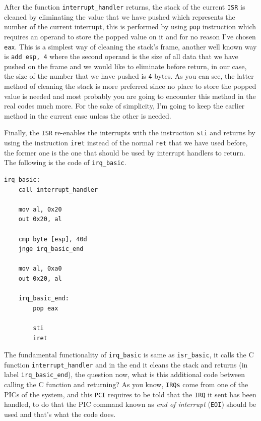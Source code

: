 After the function \lstinline!interrupt_handler! returns, the stack of
the current \lstinline!ISR! is cleaned by eliminating the value that we
have pushed which represents the number of the current interrupt, this
is performed by using \lstinline!pop! instruction which requires an
operand to store the popped value on it and for no reason I've chosen
\lstinline!eax!. This is a simplest way of cleaning the stack's frame,
another well known way is \lstinline!add esp, 4! where the second
operand is the size of all data that we have pushed on the frame and we
would like to eliminate before return, in our case, the size of the
number that we have pushed is \lstinline!4! bytes. As you can see, the
latter method of cleaning the stack is more preferred since no place to
store the popped value is needed and most probably you are going to
encounter this method in the real codes much more. For the sake of
simplicity, I'm going to keep the earlier method in the current case
unless the other is needed.

Finally, the \lstinline!ISR! re-enables the interrupts with the
instruction \lstinline!sti! and returns by using the instruction
\lstinline!iret! instead of the normal \lstinline!ret! that we have used
before, the former one is the one that should be used by interrupt
handlers to return. The following is the code of \lstinline!irq_basic!.

\begin{lstlisting}
irq_basic:
    call interrupt_handler
    
    mov al, 0x20
    out 0x20, al
    
    cmp byte [esp], 40d
    jnge irq_basic_end
    
    mov al, 0xa0
    out 0x20, al
    
    irq_basic_end:
        pop eax
        
        sti
        iret
\end{lstlisting}

The fundamental functionality of \lstinline!irq_basic! is same as
\lstinline!isr_basic!, it calls the C function
\lstinline!interrupt_handler! and in the end it cleans the stack and
returns (in label \lstinline!irq_basic_end!), the question now, what is
this additional code between calling the C function and returning? As
you know, \lstinline!IRQs! come from one of the PICs of the system, and
this \lstinline!PCI! requires to be told that the \lstinline!IRQ! it
sent has been handled, to do that the PIC command known as \emph{end of
interrupt} (\lstinline!EOI!) should be used and that's what the code
does.


